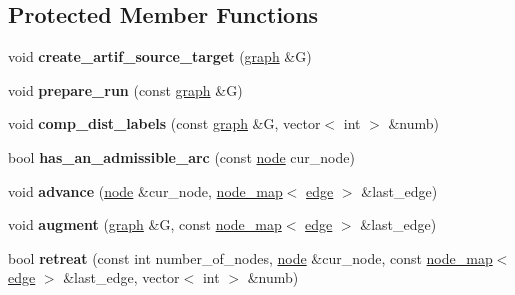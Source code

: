 \subsection*{Protected Member Functions}
\begin{DoxyCompactItemize}
\item 
\mbox{\label{classmaxflow__sap_a617016b94a4924fb2574ab87c970d49c}} 
void {\bfseries create\+\_\+artif\+\_\+source\+\_\+target} (\mbox{\hyperlink{classgraph}{graph}} \&G)
\item 
\mbox{\label{classmaxflow__sap_a4504b071456d536371ff6d07055e800d}} 
void {\bfseries prepare\+\_\+run} (const \mbox{\hyperlink{classgraph}{graph}} \&G)
\item 
\mbox{\label{classmaxflow__sap_a25424721feb100bdc357e2dfaff0f62c}} 
void {\bfseries comp\+\_\+dist\+\_\+labels} (const \mbox{\hyperlink{classgraph}{graph}} \&G, vector$<$ int $>$ \&numb)
\item 
\mbox{\label{classmaxflow__sap_a4fdfe2e37832ed2e522b5c972aa1ba5f}} 
bool {\bfseries has\+\_\+an\+\_\+admissible\+\_\+arc} (const \mbox{\hyperlink{classnode}{node}} cur\+\_\+node)
\item 
\mbox{\label{classmaxflow__sap_a0eb02b00fa0840cfad87eb6d67c9b849}} 
void {\bfseries advance} (\mbox{\hyperlink{classnode}{node}} \&cur\+\_\+node, \mbox{\hyperlink{classnode__map}{node\+\_\+map}}$<$ \mbox{\hyperlink{classedge}{edge}} $>$ \&last\+\_\+edge)
\item 
\mbox{\label{classmaxflow__sap_a02f7814313a36b30bb99c40ead6c9ef5}} 
void {\bfseries augment} (\mbox{\hyperlink{classgraph}{graph}} \&G, const \mbox{\hyperlink{classnode__map}{node\+\_\+map}}$<$ \mbox{\hyperlink{classedge}{edge}} $>$ \&last\+\_\+edge)
\item 
\mbox{\label{classmaxflow__sap_a72dc84d0f622655189cb586beb14b02b}} 
bool {\bfseries retreat} (const int number\+\_\+of\+\_\+nodes, \mbox{\hyperlink{classnode}{node}} \&cur\+\_\+node, const \mbox{\hyperlink{classnode__map}{node\+\_\+map}}$<$ \mbox{\hyperlink{classedge}{edge}} $>$ \&last\+\_\+edge, vector$<$ int $>$ \&numb)
\item 

\end{DoxyCompactItemize}
